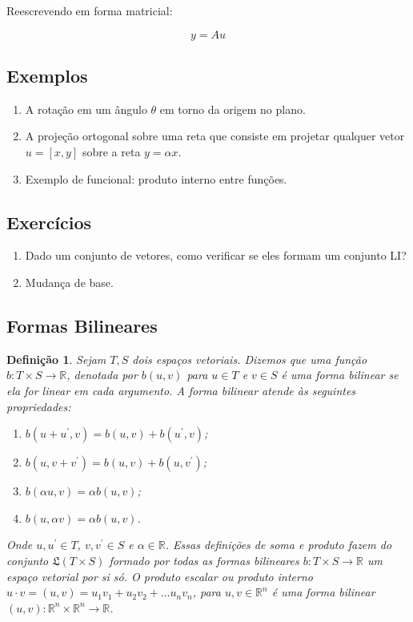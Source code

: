 \documentclass[a4paper,portuguese,9pt]{extarticle}
\newtheorem*{definition}{Definição}
\begin{document}
\begin{multicols*}{2}
Reescrevendo em forma matricial:

\begin{equation*}
    y = Au
\end{equation*}

\subsection{Exemplos}

\begin{enumerate}
    \item A rotação em um ângulo $\theta$ em torno da origem no plano.
    \item A projeção ortogonal sobre uma reta que consiste em projetar qualquer vetor $u=[x,y]$ sobre a reta $y=\alpha x$. 
    \item Exemplo de funcional: produto interno entre funções.
\end{enumerate}

\subsection{Exercícios}

\begin{enumerate}
    \item Dado um conjunto de vetores, como verificar se eles formam um conjunto LI?
    \item Mudança de base.
\end{enumerate}
\subsection{Formas Bilineares}

\begin{definition}
Sejam $T, S$ dois espaços vetoriais. Dizemos que uma função $b:T \times S \rightarrow \mathbb{R}$, denotada por $b(u,v)$ para $u \in T$ e $v \in S$ é uma forma bilinear se ela for linear em cada argumento. A forma bilinear atende às seguintes propriedades:

    \begin{enumerate}[label=(\roman*)]
        \item $b(u+u^\prime,v)=b(u,v)+b(u^\prime,v)$;
        \item $b(u, v + v^\prime)=b(u,v)+b(u, v^\prime)$;
        \item $b(\alpha u,v)=\alpha b(u,v)$;
        \item $b(u,\alpha v)=\alpha b(u,v)$.
    \end{enumerate}
Onde $u, u^\prime \in T$, $v, v^\prime \in S$ e $\alpha \in \mathbb{R}$. Essas definições de soma e produto fazem do conjunto $\mathfrak{L}(T \times S)$ formado por todas as formas bilineares $b: T \times S \rightarrow \mathbb{R}$ um espaço vetorial por si só. O produto escalar ou produto interno $u \cdot v = (u,v) = u_1 v_1+ u_2 v_2+\ldots u_n v_n$, para $u, v \in \mathbb{R}^{n}$ é uma forma bilinear $(u,v): \mathbb{R}^{n} \times \mathbb{R}^{n} \rightarrow \mathbb{R}$.
\end{definition}


\end{multicols*}
\end{document}
